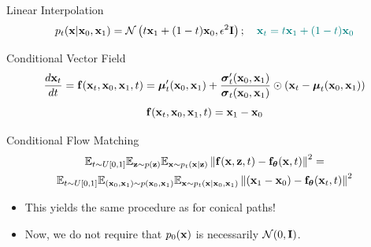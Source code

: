 \documentclass{beamer}
\begin{document}
\begin{frame}{Linear Interpolation}
	\vspace{-0.3cm}
	\[
		p_t(\mathbf{x} | \mathbf{x}_0, \mathbf{x}_1) = \mathcal{N}\left(t \mathbf{x}_1 + (1 - t) \mathbf{x}_0, \epsilon^2 \mathbf{I}\right); \quad {\color{teal}\mathbf{x}_t = t \mathbf{x}_1 + (1 - t) \mathbf{x}_0}
	\]
	\vspace{-0.5cm}
	\begin{block}{Conditional Vector Field}
		\vspace{-0.5cm}
		\[
			 \frac{d\mathbf{x}_t}{dt} = \mathbf{f}(\mathbf{x}_t, \mathbf{x}_0, \mathbf{x}_1, t) =  \boldsymbol{\mu}_t'(\mathbf{x}_0, \mathbf{x}_1) + \frac{\boldsymbol{\sigma}_t'(\mathbf{x}_0, \mathbf{x}_1)}{\boldsymbol{\sigma}_t(\mathbf{x}_0, \mathbf{x}_1)} \odot (\mathbf{x}_t - \boldsymbol{\mu}_t(\mathbf{x}_0, \mathbf{x}_1))
		\]
		\vspace{-0.5cm}
		\[
			\mathbf{f}(\mathbf{x}_t, \mathbf{x}_0, \mathbf{x}_1, t) = \mathbf{x}_1 - \mathbf{x}_0
		\]
		\vspace{-0.7cm}
	\end{block}
	\begin{block}{Conditional Flow Matching}
		\vspace{-0.7cm}
		\begin{multline*}
			\mathbb{E}_{t \sim U[0, 1]} \mathbb{E}_{\mathbf{z} \sim p(\mathbf{z})} \mathbb{E}_{\mathbf{x} \sim p_t(\mathbf{x} | \mathbf{z})}\left\| \mathbf{f}(\mathbf{x}, \mathbf{z}, t) - \mathbf{f}_{\boldsymbol{\theta}}(\mathbf{x}, t) \right\|^2 = \\
		 \mathbb{E}_{t \sim U[0, 1]} \mathbb{E}_{(\mathbf{x}_0, \mathbf{x}_1) \sim p(\mathbf{x}_0, \mathbf{x}_1)} \mathbb{E}_{\mathbf{x} \sim p_t(\mathbf{x} | \mathbf{x}_0, \mathbf{x}_1)} \left\| (\mathbf{x}_1 - \mathbf{x}_0) - \mathbf{f}_{\boldsymbol{\theta}}(\mathbf{x}_t, t) \right\|^2
		\end{multline*}
		\vspace{-0.5cm}
	\end{block}
	\begin{itemize}
		\item This yields the same procedure as for conical paths!
		\item Now, we do not require that $p_0(\mathbf{x})$ is necessarily $\mathcal{N}(0, \mathbf{I})$.
	\end{itemize} 
\end{frame}
\end{document}
